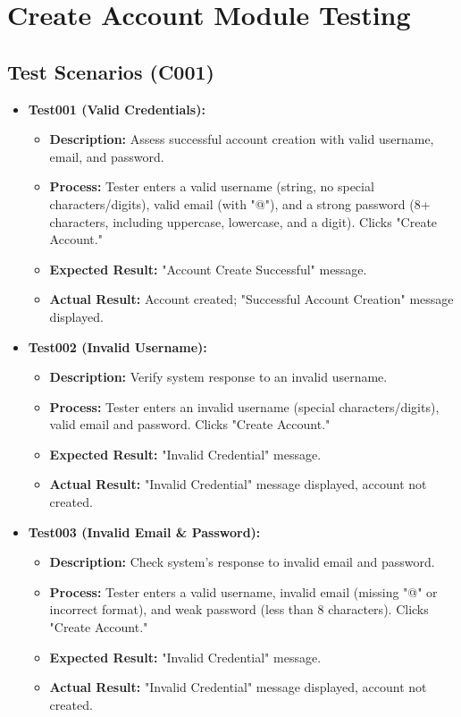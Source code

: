 \documentclass{article}
\begin{document}
\section{Create Account Module Testing}

\subsection{Test Scenarios (C001)}

\begin{itemize}
    \item \textbf{Test001 (Valid Credentials):}
    \begin{itemize}
        \item \textbf{Description:} Assess successful account creation with valid username, email, and password.
        \item \textbf{Process:} Tester enters a valid username (string, no special characters/digits), valid email (with "@"), and a strong password (8+ characters, including uppercase, lowercase, and a digit). Clicks "Create Account."
        \item \textbf{Expected Result:} "Account Create Successful" message.
        \item \textbf{Actual Result:} Account created; "Successful Account Creation" message displayed.
    \end{itemize}
    \item \textbf{Test002 (Invalid Username):}
    \begin{itemize}
        \item \textbf{Description:} Verify system response to an invalid username.
        \item \textbf{Process:} Tester enters an invalid username (special characters/digits), valid email and password. Clicks "Create Account."
        \item \textbf{Expected Result:} "Invalid Credential" message.
        \item \textbf{Actual Result:} "Invalid Credential" message displayed, account not created.
    \end{itemize}
    \item \textbf{Test003 (Invalid Email \& Password):}
    \begin{itemize}
        \item \textbf{Description:} Check system's response to invalid email and password.
        \item \textbf{Process:} Tester enters a valid username, invalid email (missing "@" or incorrect format), and weak password (less than 8 characters). Clicks "Create Account."
        \item \textbf{Expected Result:} "Invalid Credential" message.
        \item \textbf{Actual Result:} "Invalid Credential" message displayed, account not created.
    \end{itemize}
\end{itemize}
\end{document}
